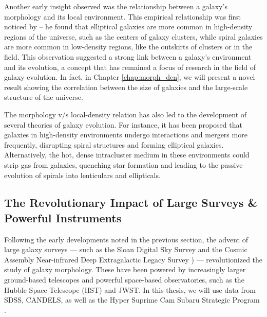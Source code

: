 Another early insight observed was the relationship between a galaxy's morphology and its local environment. This empirical relationship was first noticed by \citet{dressler_84} -- he found that elliptical galaxies are more common in high-density regions of the universe, such as the centers of galaxy clusters, while spiral galaxies are more common in low-density regions, like the outskirts of clusters or in the field. This observation suggested a strong link between a galaxy's environment and its evolution, a concept that has remained a focus of research in the field of galaxy evolution. In fact, in Chapter \ref{chap:morph_den}, we will present a novel result showing the correlation between the size of galaxies and the large-scale structure of the universe. 

The morphology v/s local-density relation has also led to the development of several theories of galaxy evolution. For instance, it has been proposed that galaxies in high-density environments undergo interactions and mergers more frequently, disrupting spiral structures and forming elliptical galaxies. Alternatively, the hot, dense intracluster medium in these environments could strip gas from galaxies, quenching star formation and leading to the passive evolution of spirals into lenticulars and ellipticals.

\subsection{The Revolutionary Impact of Large Surveys \& Powerful Instruments} \label{sec_intro:large_surveys}

Following the early developments noted in the previous section, the advent of large galaxy surveys --- such as the Sloan Digital Sky Survey \citep[SDSS; ][]{sdss_tech_summary} and the Cosmic Assembly Near-infrared Deep Extragalactic Legacy Survey \citep[CANDELS; ][]{candels_1}) --- revolutionized the study of galaxy morphology. These have been powered by increasingly larger ground-based telescopes and powerful space-based observatories, such as the Hubble Space Telescope (HST) and JWST. In this thesis, we will use data from SDSS, CANDELS, as well as the Hyper Suprime Cam Subaru Strategic Program \citep[HSC-SSP; ][]{hsc_design}. 

